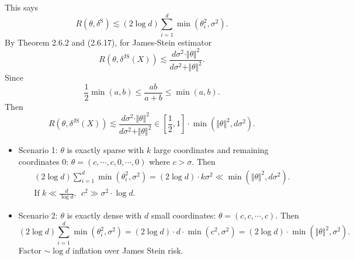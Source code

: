 \documentclass[a4paper]{article}
\begin{document}
\begin{remark}
	This says
	\begin{equation}
		R(\theta,\delta^{\text{S}}) \lesssim (2\log d)\sum\limits_{i=1}^d \min(\theta_i^2,\sigma^2).
	\end{equation}
	By Theorem 2.6.2 and (2.6.17), for James-Stein estimator
	\begin{equation*}
		R(\theta,\delta^{\text{JS}}(X)) \lesssim \frac{d \sigma^2 \cdot \Vert \theta \Vert ^2}{d \sigma^2 + \Vert \theta \Vert ^2}.
	\end{equation*}
	Since
	\begin{equation*}
		\frac{1}{2} \min (a,b) \leq \frac{ab}{a+b} \leq \min(a,b).
	\end{equation*}
	Then
	\begin{equation}
		R(\theta,\delta^{\text{JS}}(X)) \lesssim \frac{d \sigma^2 \cdot \Vert \theta \Vert ^2}{d \sigma^2 + \Vert \theta \Vert ^2} \in \left[\frac{1}{2},1\right] \cdot \min(\Vert \theta \Vert ^2, d\sigma^2).
	\end{equation}
	\begin{itemize}[leftmargin=*]
		\item Scenario 1: $\theta$ is exactly sparse with $k$ large coordinates and remaining coordinates $0$: $\theta = (c,\cdots,c,0,\cdots,0)$ where $c > \sigma$. Then
		\begin{equation}
			\begin{aligned}
				& (2\log d)\sum\limits_{i=1}^d \min(\theta_i^2,\sigma^2) = (2\log d) \cdot k\sigma^2 \ll \min(\Vert \theta \Vert ^2, d\sigma^2). \\
				& \text{If } k \ll \frac{d}{\log d}, \ \ c^2 \gg \sigma^2 \cdot \log d.
			\end{aligned}
		\end{equation}
		\item Scenario 2: $\theta$ is exactly dense with $d$ small coordinates: $\theta = (c,c,\cdots,c)$. Then
		\begin{equation}
			(2\log d)\sum\limits_{i=1}^d \min(\theta_i^2,\sigma^2) = (2\log d) \cdot d \cdot \min(c^2,\sigma^2) = (2\log d) \cdot \min(\Vert \theta \Vert ^2,\sigma^2).
		\end{equation}
		Factor $\sim \log d$ inflation over James Stein risk.
	\end{itemize}
\end{remark}
\end{document}
